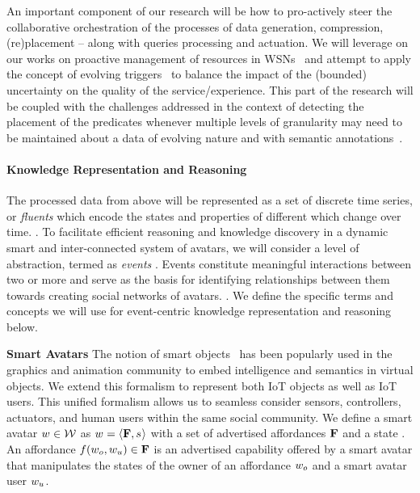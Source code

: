 An important component of our research will be how to pro-actively steer the collaborative orchestration of the processes of data generation, compression, (re)placement -- along with queries processing and actuation. We will leverage on our works on proactive management of resources in WSNs~\cite{McClurgTY12} and attempt to apply the concept of evolving triggers~\cite{old-r35} to balance the impact of the (bounded) uncertainty on the quality of the service/experience. This part of the research will be coupled with the challenges addressed in the context of detecting the placement of the predicates whenever multiple levels of granularity may need to be maintained about a data of evolving nature and with semantic annotations~\cite{VaismanZ09,TrajcevskiDVAZT15}.



\paragraph{Knowledge Representation and Reasoning}

The processed data from above will be represented as a set of discrete time series, or \emph{fluents} which encode the states and properties of different \avatar which change over time. . To facilitate efficient reasoning and knowledge discovery in a dynamic smart and inter-connected system of avatars, we will consider a level of abstraction, termed as \emph{events }. Events constitute meaningful interactions between two or more \avatar and serve as the basis for identifying relationships between them towards creating social networks of avatars. . We define the specific terms and concepts we will use for event-centric knowledge representation and reasoning below.

\noindent \textbf{Smart Avatars} The notion of smart objects~\cite{Kallmann:1999:DIS:323663.323683} has been popularly used in the graphics and animation community to embed intelligence and semantics in virtual objects. We extend this formalism to represent both IoT objects as well as IoT users. This unified formalism allows us to seamless consider sensors, controllers, actuators, and human users within the same social community.  We define a smart avatar $w_{} \in \mathcal{W}$ as $w_{} = \langle \mathbf{F}, s_{} \rangle$ with a set of advertised affordances $\mathbf{F}$ and a state \state{}. An affordance $f(w_o, w_u) \in \mathbf{F}$ is an advertised capability offered by a smart avatar that manipulates the states of the owner of an affordance $w_o$ and a smart avatar user $w_u$.

